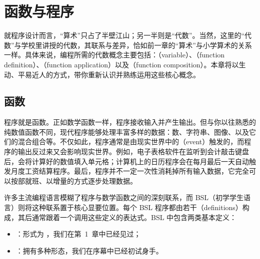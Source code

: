 
\chapter{函数与程序}
\label{sec:ch02_functions}

就程序设计而言，“算术”只占了半壁江山；另一半则是“代数”。当然，这里的“代数”与学校里讲授的代数，其联系与差异，恰如前一章的“算术”与小学算术的关系一样。具体来说，编程所需的代数概念主要包括：（variable）、（function definition）、（function application）以及（function composition）。本章将以生动、平易近人的方式，带你重新认识并熟练运用这些核心概念。


\section{函数}
\label{sec:2.1}

程序就是函数。正如数学函数一样，程序接收输入并产生输出。但与你以往熟悉的纯数值函数不同，现代程序能够处理丰富多样的数据：数、字符串、图像、以及它们的混合组合等。不仅如此，程序通常是由现实世界中的（event）触发的，而程序的输出反过来又会影响现实世界。例如，电子表格软件在监听到会计敲击键盘后，会将计算好的数值填入单元格；计算机上的日历程序会在每月最后一天自动触发月度工资结算程序。最后，程序并不一定一次性消耗掉所有输入数据，它完全可以按部就班、以增量的方式逐步处理数据。

\begin{notebox}[程序与定义]
许多主流编程语言模糊了程序与数学函数之间的深刻联系，而 BSL（初学学生语言）则将这种联系置于核心显要位置。每个 BSL 程序都由若干（definitions）构成，其后通常跟着一个调用这些定义的表达式。BSL 中包含两类基本定义：
\begin{itemize}
  \item {}：形式为 ，我们在第~1~章中已经见过；
  \item {}：拥有多种形态，我们在序幕中已经初试身手。
\end{itemize}
\end{notebox}

